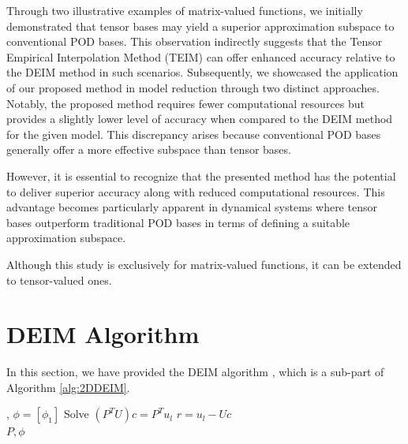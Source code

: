 \documentclass{article}
\begin{document}
Through two illustrative examples of matrix-valued functions, we initially demonstrated that tensor bases may yield a superior approximation subspace to conventional POD bases. This observation indirectly suggests that the Tensor Empirical Interpolation Method (TEIM) can offer enhanced accuracy relative to the DEIM method in such scenarios. Subsequently, we showcased the application of our proposed method in model reduction through two distinct approaches. Notably, the proposed method requires fewer computational resources but provides a slightly lower level of accuracy when compared to the DEIM method for the given model. This discrepancy arises because conventional POD bases generally offer a more effective subspace than tensor bases.

However, it is essential to recognize that the presented method has the potential to deliver superior accuracy along with reduced computational resources. This advantage becomes particularly apparent in dynamical systems where tensor bases outperform traditional POD bases in terms of defining a suitable approximation subspace.


Although this study is exclusively for matrix-valued functions, it can be extended to tensor-valued ones.

\appendix
\section{DEIM Algorithm}
\label{sec:sample: appendix}
 In this section, we have provided the DEIM algorithm \cite{DEIM}, which is a sub-part of Algorithm \ref{alg:2DDEIM}.
\begin{algorithm}[]
{\fontsize{8pt}{8pt}\selectfont
\caption{DEIM}
\begin{algorithmic}
, $\phi =[\phi_1]$
    \State Solve \textbf{$(P^TU)c=P^Tu_l$}
     \State \textbf{$r=u_l-Uc$}
\EndFor\\
\Return $P,\phi$
\end{algorithmic}
}
\end{algorithm}
\end{document}
